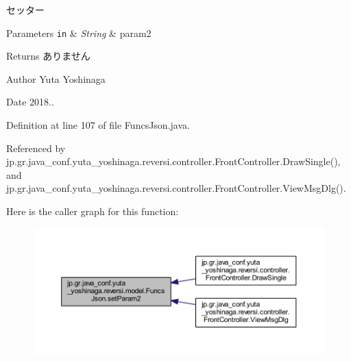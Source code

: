 セッター 


\begin{DoxyParams}[1]{Parameters}
\mbox{\tt in}  & {\em String} & param2 \\
\hline
\end{DoxyParams}
\begin{DoxyReturn}{Returns}
ありません 
\end{DoxyReturn}
\begin{DoxyAuthor}{Author}
Yuta Yoshinaga 
\end{DoxyAuthor}
\begin{DoxyDate}{Date}
2018.. 
\end{DoxyDate}


Definition at line 107 of file Funcs\+Json.\+java.



Referenced by jp.\+gr.\+java\+\_\+conf.\+yuta\+\_\+yoshinaga.\+reversi.\+controller.\+Front\+Controller.\+Draw\+Single(), and jp.\+gr.\+java\+\_\+conf.\+yuta\+\_\+yoshinaga.\+reversi.\+controller.\+Front\+Controller.\+View\+Msg\+Dlg().

Here is the caller graph for this function\+:\nopagebreak
\begin{figure}[H]
\begin{center}
\leavevmode
\includegraphics[width=350pt]{classjp_1_1gr_1_1java__conf_1_1yuta__yoshinaga_1_1reversi_1_1model_1_1_funcs_json_aa1d17801d47f0d701f6792fa5f06e435_icgraph}
\end{center}
\end{figure}
\mbox{\label{classjp_1_1gr_1_1java__conf_1_1yuta__yoshinaga_1_1reversi_1_1model_1_1_funcs_json_a27bc732004c573269cb63e71c1d1abcc}} 
